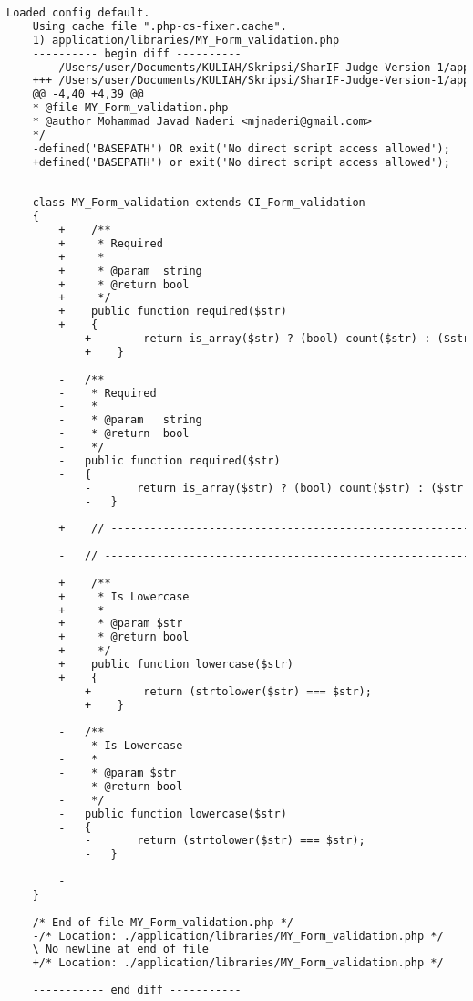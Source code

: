 \begin{lstlisting}[language=diff, caption=Perubahan pada kode MY\_Form\_validation.php]
	Loaded config default.
	Using cache file ".php-cs-fixer.cache".
	1) application/libraries/MY_Form_validation.php
	---------- begin diff ----------
	--- /Users/user/Documents/KULIAH/Skripsi/SharIF-Judge-Version-1/application/libraries/MY_Form_validation.php
	+++ /Users/user/Documents/KULIAH/Skripsi/SharIF-Judge-Version-1/application/libraries/MY_Form_validation.php
	@@ -4,40 +4,39 @@
	* @file MY_Form_validation.php
	* @author Mohammad Javad Naderi <mjnaderi@gmail.com>
	*/
	-defined('BASEPATH') OR exit('No direct script access allowed');
	+defined('BASEPATH') or exit('No direct script access allowed');
	
	
	class MY_Form_validation extends CI_Form_validation
	{
		+    /**
		+     * Required
		+     *
		+     * @param	string
		+     * @return	bool
		+     */
		+    public function required($str)
		+    {
			+        return is_array($str) ? (bool) count($str) : ($str !== '');
			+    }
		
		-	/**
		-	 * Required
		-	 *
		-	 * @param	string
		-	 * @return	bool
		-	 */
		-	public function required($str)
		-	{
			-		return is_array($str) ? (bool) count($str) : ($str !== '');
			-	}
		
		+    // -------------------------------------------------------------------------
		
		-	// -------------------------------------------------------------------------
		
		+    /**
		+     * Is Lowercase
		+     *
		+     * @param $str
		+     * @return bool
		+     */
		+    public function lowercase($str)
		+    {
			+        return (strtolower($str) === $str);
			+    }
		
		-	/**
		-	 * Is Lowercase
		-	 *
		-	 * @param $str
		-	 * @return bool
		-	 */
		-	public function lowercase($str)
		-	{
			-		return (strtolower($str) === $str);
			-	}
		
		-
	}
	
	/* End of file MY_Form_validation.php */
	-/* Location: ./application/libraries/MY_Form_validation.php */
	\ No newline at end of file
	+/* Location: ./application/libraries/MY_Form_validation.php */
	
	----------- end diff -----------
\end{lstlisting}

